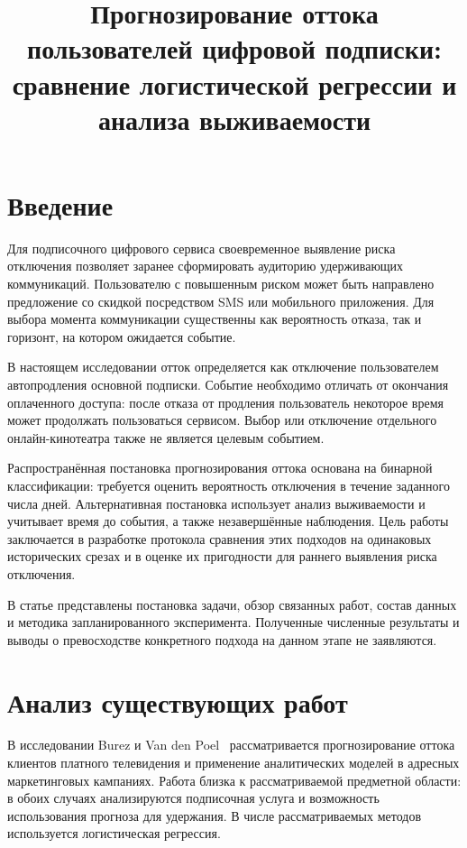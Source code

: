\documentclass{misisarticle}
\title{Прогнозирование оттока пользователей цифровой подписки: сравнение логистической регрессии и анализа выживаемости}
\begin{document}
\maketitle

\section{Введение}

Для подписочного цифрового сервиса своевременное выявление риска отключения позволяет заранее сформировать аудиторию удерживающих коммуникаций. Пользователю с повышенным риском может быть направлено предложение со скидкой посредством SMS или мобильного приложения. Для выбора момента коммуникации существенны как вероятность отказа, так и горизонт, на котором ожидается событие.

В настоящем исследовании отток определяется как отключение пользователем автопродления основной подписки. Событие необходимо отличать от окончания оплаченного доступа: после отказа от продления пользователь некоторое время может продолжать пользоваться сервисом. Выбор или отключение отдельного онлайн-кинотеатра также не является целевым событием.

Распространённая постановка прогнозирования оттока основана на бинарной классификации: требуется оценить вероятность отключения в течение заданного числа дней. Альтернативная постановка использует анализ выживаемости и учитывает время до события, а также незавершённые наблюдения. Цель работы заключается в разработке протокола сравнения этих подходов на одинаковых исторических срезах и в оценке их пригодности для раннего выявления риска отключения.

В статье представлены постановка задачи, обзор связанных работ, состав данных и методика запланированного эксперимента. Полученные численные результаты и выводы о превосходстве конкретного подхода на данном этапе не заявляются.

\section{Анализ существующих работ}

В исследовании Burez и Van den Poel~\cite{burez2007} рассматривается прогнозирование оттока клиентов платного телевидения и применение аналитических моделей в адресных маркетинговых кампаниях. Работа близка к рассматриваемой предметной области: в обоих случаях анализируются подписочная услуга и возможность использования прогноза для удержания. В числе рассматриваемых методов используется логистическая регрессия.
\end{document}

